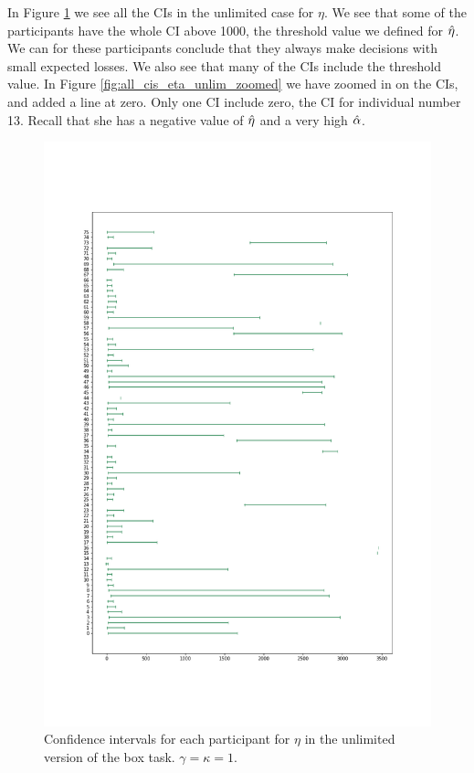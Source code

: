 In Figure \ref{fig:all_cis_eta_unlim_v2} we see all the CIs in the unlimited case for $\eta$. We see that some of the participants have the whole CI above 1000, the threshold value we defined for $\hat{\eta}$. We can for these participants conclude that they always make decisions with small expected losses. We also see that many of the CIs include the threshold value. In Figure \ref{fig:all_cis_eta_unlim_zoomed} we have zoomed in on the CIs, and added a line at zero. Only one CI include zero, the CI for individual number 13. Recall that she has a negative value of $\hat{\eta}$ and a very high $\hat{\alpha}$.
\begin{figure}
    \centering
    \includegraphics[scale=0.38]{pictures/test_cis_eta_unlim.png}
    \caption[CIs for $\eta$, unlimited. $\gamma=\kappa=1$]{Confidence intervals for each participant for $\eta$ in the unlimited version of the box task. $\gamma=\kappa=1$.}
    \label{fig:all_cis_eta_unlim_v2}
\end{figure}


